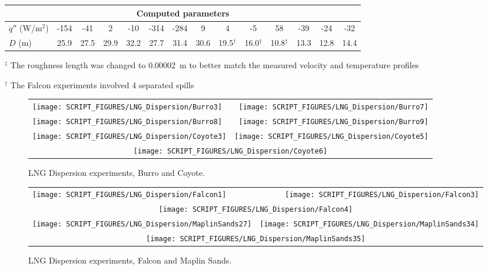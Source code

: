 \begin{sidewaystable}[p]
\begin{center}
\begin{tabular}{|l|c|c|c|c|c|c|c|c|c|c|c|c|c|}
\multicolumn{14}{|c|}{Computed parameters} \\ \hline
$\dot{q}''$ (W/m$^2$)    & -154   & -41    & 2      & -10    & -314   & -284   & 9           & 4           & -5          & 58                & -39             & -24            & -32     \\ \hline
$D$ (m)                  & 25.9   & 27.5   & 29.9   & 32.2   & 27.7   & 31.4   & 30.6        & 19.5$^\dag$ & 16.0$^\dag$ & 10.8$^\dag$       & 13.3            & 12.8           & 14.4    \\ \hline
\end{tabular}
\end{center}
$^\ddag$ The roughness length was changed to 0.00002~m to better match the measured velocity and temperature profiles

$^\dag$ The Falcon experiments involved 4 separated spills
\label{tab:LNG_Dispersion}
\end{sidewaystable}


\begin{figure}[p]
\begin{tabular*}{\textwidth}{l@{\extracolsep{\fill}}r}
\texttt{[image: SCRIPT\_FIGURES/LNG\_Dispersion/Burro3]} &
\texttt{[image: SCRIPT\_FIGURES/LNG\_Dispersion/Burro7]} \\
\texttt{[image: SCRIPT\_FIGURES/LNG\_Dispersion/Burro8]} &
\texttt{[image: SCRIPT\_FIGURES/LNG\_Dispersion/Burro9]} \\
\texttt{[image: SCRIPT\_FIGURES/LNG\_Dispersion/Coyote3]} &
\texttt{[image: SCRIPT\_FIGURES/LNG\_Dispersion/Coyote5]} \\
\multicolumn{2}{c}{\texttt{[image: SCRIPT\_FIGURES/LNG\_Dispersion/Coyote6]}}
\end{tabular*}
\caption[LNG Dispersion experiments, Burro and Coyote]{LNG Dispersion experiments, Burro and Coyote.}
\label{LNG_Dispersion_1}
\end{figure}

\begin{figure}[p]
\begin{tabular*}{\textwidth}{l@{\extracolsep{\fill}}r}
\texttt{[image: SCRIPT\_FIGURES/LNG\_Dispersion/Falcon1]} &
\texttt{[image: SCRIPT\_FIGURES/LNG\_Dispersion/Falcon3]} \\
\multicolumn{2}{c}{\texttt{[image: SCRIPT\_FIGURES/LNG\_Dispersion/Falcon4]}} \\
\texttt{[image: SCRIPT\_FIGURES/LNG\_Dispersion/MaplinSands27]} &
\texttt{[image: SCRIPT\_FIGURES/LNG\_Dispersion/MaplinSands34]} \\
\multicolumn{2}{c}{\texttt{[image: SCRIPT\_FIGURES/LNG\_Dispersion/MaplinSands35]}}
\end{tabular*}
\caption[LNG Dispersion experiments, Falson and Maplin Sands]{LNG Dispersion experiments, Falcon and Maplin Sands.}
\label{LNG_Dispersion_2}
\end{figure}

